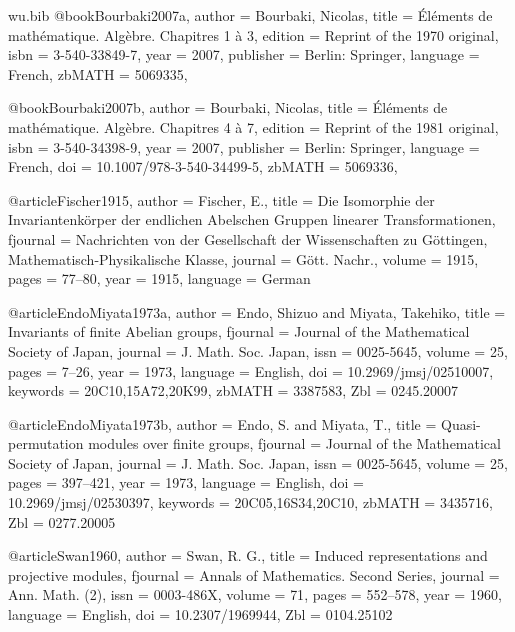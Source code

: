 \documentclass[12pt,a4paper]{article}
\theoremstyle{definition}
\begin{document}
\begin{filecontents}{wu.bib}
@book{Bourbaki2007a,
	author = {Bourbaki, Nicolas},
title = {{\'E}l{\'e}ments de math{\'e}matique. {Alg{\`e}bre}. {Chapitres} 1
{\`a} 3}, edition = {Reprint of the 1970 original}, isbn = {3-540-33849-7}, year
= {2007}, publisher = {Berlin: Springer}, language = {French}, zbMATH =
{5069335}, }

@book{Bourbaki2007b,
	author = {Bourbaki, Nicolas},
title = {{\'E}l{\'e}ments de math{\'e}matique. {Alg{\`e}bre}. {Chapitres} 4
{\`a} 7}, edition = {Reprint of the 1981 original}, isbn = {3-540-34398-9}, year
= {2007}, publisher = {Berlin: Springer}, language = {French}, doi =
{10.1007/978-3-540-34499-5}, zbMATH = {5069336}, }

@article{Fischer1915,
	author = {Fischer, E.},
	title = {Die {I}somorphie der {I}nvariantenk{\"o}rper der endlichen
	         {A}belschen {G}ruppen linearer {T}ransformationen},
	fjournal = {Nachrichten von der Gesellschaft der Wissenschaften zu
	            {G}{\"o}ttingen, Mathematisch-Physikalische Klasse},
	journal = {G{\"o}tt. Nachr.},
	volume = {1915},
	pages = {77--80},
	year = {1915},
	language = {German}
}

@article{EndoMiyata1973a,
	author = {Endo, Shizuo and Miyata, Takehiko},
	title = {Invariants of finite {Abelian} groups},
	fjournal = {Journal of the Mathematical Society of Japan},
	journal = {J. Math. Soc. Japan},
	issn = {0025-5645},
	volume = {25},
	pages = {7--26},
	year = {1973},
	language = {English},
	doi = {10.2969/jmsj/02510007},
	keywords = {20C10,15A72,20K99},
	zbMATH = {3387583},
	Zbl = {0245.20007}
}

@article{EndoMiyata1973b,
	author = {Endo, S. and Miyata, T.},
	title = {Quasi-permutation modules over finite groups},
	fjournal = {Journal of the Mathematical Society of Japan},
	journal = {J. Math. Soc. Japan},
	issn = {0025-5645},
	volume = {25},
	pages = {397--421},
	year = {1973},
	language = {English},
	doi = {10.2969/jmsj/02530397},
	keywords = {20C05,16S34,20C10},
	zbMATH = {3435716},
	Zbl = {0277.20005}
}


@article{Swan1960,
    author = {Swan, R. G.},
    title = {Induced representations and projective modules},
    fjournal = {Annals of Mathematics. Second Series},
    journal = {Ann. Math. (2)},
    issn = {0003-486X},
    volume = {71},
    pages = {552--578},
    year = {1960},
    language = {English},
    doi = {10.2307/1969944},
    Zbl = {0104.25102}
}


\end{filecontents}
\end{document}
